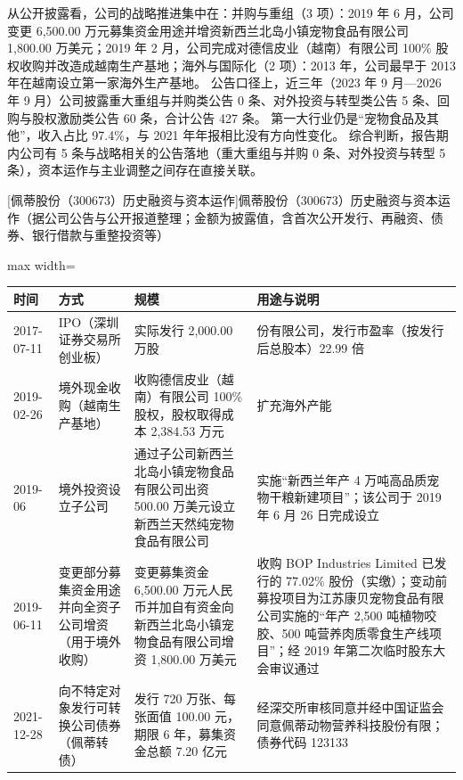  从公开披露看，公司的战略推进集中在：并购与重组（3 项）：2019 年 6 月，公司变更 6,500.00 万元募集资金用途并增资新西兰北岛小镇宠物食品有限公司 1,800.00 万美元；2019 年 2 月，公司完成对德信皮业（越南）有限公司 100\% 股权收购并改造成越南生产基地；海外与国际化（2 项）：2013 年，公司最早于 2013 年在越南设立第一家海外生产基地。 公告口径上，近三年（2023 年 9 月---2026 年 9 月）公司披露重大重组与并购类公告 0 条、对外投资与转型类公告 5 条、回购与股权激励类公告 60 条，合计公告 427 条。 第一大行业仍是“宠物食品及其他”，收入占比 97.4\%，与 2021 年年报相比没有方向性变化。 综合判断，报告期内公司有 5 条与战略相关的公告落地（重大重组与并购 0 条、对外投资与转型 5 条），资本运作与主业调整之间存在直接关联。

\begin{center}\small\setlength{\tabcolsep}{4pt}
[佩蒂股份（300673）历史融资与资本运作]{佩蒂股份（300673）历史融资与资本运作（据公司公告与公开报道整理；金额为披露值，含首次公开发行、再融资、债券、银行借款与重整投资等）}
\begin{adjustbox}{max width=\textwidth}
\begin{tabular}{@{}p{1.45cm}p{2.55cm}p{4.05cm}p{4.95cm}@{}}
\toprule
时间 & 方式 & 规模 & 用途与说明 \\
\midrule
2017-07-11 & IPO（深圳证券交易所创业板） & 实际发行 2,\allowbreak{}000.00 万股 & 份有限公司，\allowbreak{}发行市盈率（按发行后总股本）22.99 倍 \\
2019-02-26 & 境外现金收购（越南生产基地） & 收购德信皮业（越南）有限公司 100\% 股权，\allowbreak{}股权取得成本 2,\allowbreak{}384.53 万元 & 扩充海外产能 \\
2019-06 & 境外投资设立子公司 & 通过子公司新西兰北岛小镇宠物食品有限公司出资 500.00 万美元设立新西兰天然纯宠物食品有限公司 & 实施“新西兰年产 4 万吨高品质宠物干粮新建项目”；该公司于 2019 年 6 月 26 日完成设立 \\
2019-06-11 & 变更部分募集资金用途并向全资子公司增资（用于境外收购） & 变更募集资金 6,\allowbreak{}500.00 万元人民币并加自有资金向新西兰北岛小镇宠物食品有限公司增资 1,\allowbreak{}800.00 万美元 & 收购 BOP Industries Limited 已发行的 77.02\% 股份（实缴）；变动前募投项目为江苏康贝宠物食品有限公司实施的“年产 2,\allowbreak{}500 吨植物咬胶、\allowbreak{}500 吨营养肉质零食生产线项目”；经 2019 年第二次临时股东大会审议通过 \\
2021-12-28 & 向不特定对象发行可转换公司债券（佩蒂转债） & 发行 720 万张、\allowbreak{}每张面值 100.00 元，\allowbreak{}期限 6 年，\allowbreak{}募集资金总额 7.20 亿元 & 经深交所审核同意并经中国证监会同意佩蒂动物营养科技股份有限；债券代码 123133 \\
\bottomrule
\end{tabular}
\end{adjustbox}
\end{center}

